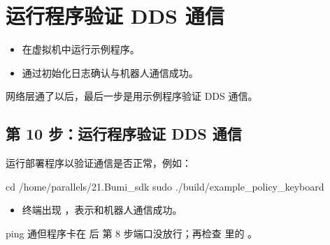 \chapter{运行程序验证 DDS 通信}
\label{chap:verify}
\begin{intro}
\begin{itemize}
\item 在虚拟机中运行示例程序。
\item 通过初始化日志确认与机器人通信成功。
\end{itemize}
\end{intro}
网络层通了以后，最后一步是用示例程序验证 DDS 通信。

\section{第 10 步：运行程序验证 DDS 通信}
\label{step:10}
运行部署程序以验证通信是否正常，例如：

\begin{command}
cd /home/parallels/21.Bumi_sdk
sudo ./build/example_policy_keyboard
\end{command}

\begin{expected}
\begin{itemize}
\item 终端出现 ，表示和机器人通信成功。
\end{itemize}
\end{expected}

\begin{faq}{ping 通但程序卡在  后}
第 8 步端口没放行；再检查  里的 。
\end{faq}
